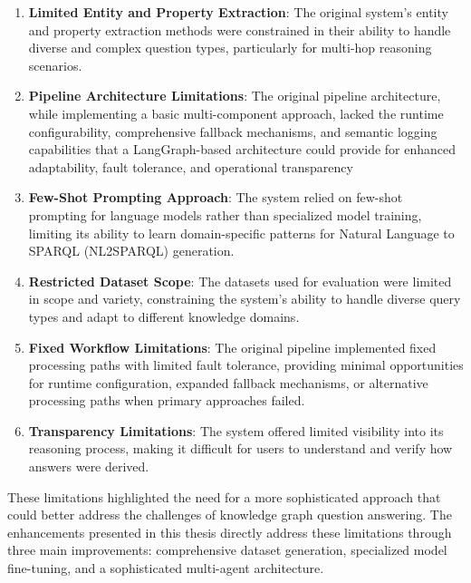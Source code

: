 \begin{enumerate}
    \item \textbf{Limited Entity and Property Extraction}: The original system's entity and property extraction methods were constrained in their ability to handle diverse and complex question types, particularly for multi-hop reasoning scenarios.
    
    \item \textbf{Pipeline Architecture Limitations}: The original pipeline architecture, while implementing a basic multi-component approach, lacked the runtime configurability, comprehensive fallback mechanisms, and semantic logging capabilities that a LangGraph-based architecture could provide for enhanced adaptability, fault tolerance, and operational transparency

    \item \textbf{Few-Shot Prompting Approach}: The system relied on few-shot prompting for language models rather than specialized model training, limiting its ability to learn domain-specific patterns for Natural Language to SPARQL (NL2SPARQL) generation.
    
    \item \textbf{Restricted Dataset Scope}: The datasets used for evaluation were limited in scope and variety, constraining the system's ability to handle diverse query types and adapt to different knowledge domains.
    
    \item \textbf{Fixed Workflow Limitations}: The original pipeline implemented fixed processing paths with limited fault tolerance, providing minimal opportunities for runtime configuration, expanded fallback mechanisms, or alternative processing paths when primary approaches failed.

    \item \textbf{Transparency Limitations}: The system offered limited visibility into its reasoning process, making it difficult for users to understand and verify how answers were derived.
\end{enumerate}

These limitations highlighted the need for a more sophisticated approach that could better address the challenges of knowledge graph question answering. The enhancements presented in this thesis directly address these limitations through three main improvements: comprehensive dataset generation, specialized model fine-tuning, and a sophisticated multi-agent architecture.

